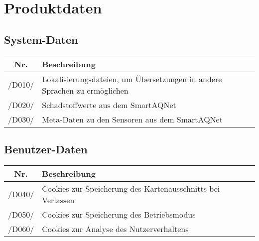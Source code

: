 \section{Produktdaten}
\subsection{System-Daten}
\begin{tabularx}{\textwidth}{| c | X | c |}
	\hline
	\textbf{Nr.} & 
	\textbf{Beschreibung}\\
	\hline
    /D010/ & Lokalisierungsdateien, um Übersetzungen in andere Sprachen zu ermöglichen \\
    \hline
    /D020/ & Schadstoffwerte aus dem SmartAQNet \\
    \hline
    /D030/ & Meta-Daten zu den Sensoren aus dem SmartAQNet \\
    \hline
\end{tabularx}
\subsection{Benutzer-Daten}
\begin{tabularx}{\textwidth}{| c | X | c |}
	\hline
	\textbf{Nr.} & 
	\textbf{Beschreibung}\\
	\hline
    /D040/ & Cookies zur Speicherung des Kartenausschnitts bei Verlassen \\
    \hline
    /D050/ & Cookies zur Speicherung des Betriebsmodus \\
    \hline
    /D060/ & Cookies zur Analyse des Nutzerverhaltens \\
    \hline
\end{tabularx}